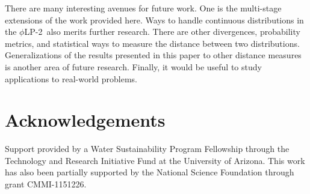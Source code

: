 \documentclass[12pt]{article}
\theoremstyle{plain}
\theoremstyle{definition}
\theoremstyle{remark}
\newcommand{\plp}{$\phi$LP-2}
\begin{document}
There are many interesting avenues for future work. 
One is the multi-stage extensions of the work provided here. 
Ways to handle continuous distributions in the \plp\ also merits further research. 
There are other divergences, probability metrics, and statistical ways to measure the distance between two distributions. 
Generalizations of the results presented in this paper to other distance measures is another area of future research. 
Finally, it would be useful to study applications to real-world problems.



%
% 

\section*{Acknowledgements}
Support provided by a Water Sustainability Program Fellowship through the Technology and Research Initiative Fund at the University of Arizona.
This work has also been partially supported by the National Science Foundation through grant CMMI-1151226.





\end{document}
